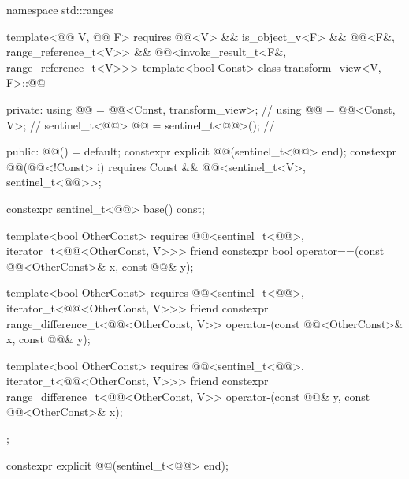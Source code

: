 %
\begin{codeblock}
namespace std::ranges {
  template<@@ V, @@ F>
    requires @@<V> && is_object_v<F> &&
             @@<F&, range_reference_t<V>> &&
             @@<invoke_result_t<F&, range_reference_t<V>>>
  template<bool Const>
  class transform_view<V, F>::@@ {
  private:
    using @@ = @@<Const, transform_view>;  // \expos
    using @@ = @@<Const, V>;                 // \expos
    sentinel_t<@@> @@ = sentinel_t<@@>();         // \expos

  public:
    @@() = default;
    constexpr explicit @@(sentinel_t<@@> end);
    constexpr @@(@@<!Const> i)
      requires Const && @@<sentinel_t<V>, sentinel_t<@@>>;

    constexpr sentinel_t<@@> base() const;

    template<bool OtherConst>
      requires @@<sentinel_t<@@>, iterator_t<@@<OtherConst, V>>>
    friend constexpr bool operator==(const @@<OtherConst>& x, const @@& y);

    template<bool OtherConst>
      requires @@<sentinel_t<@@>, iterator_t<@@<OtherConst, V>>>
    friend constexpr range_difference_t<@@<OtherConst, V>>
      operator-(const @@<OtherConst>& x, const @@& y);

    template<bool OtherConst>
      requires @@<sentinel_t<@@>, iterator_t<@@<OtherConst, V>>>
    friend constexpr range_difference_t<@@<OtherConst, V>>
      operator-(const @@& y, const @@<OtherConst>& x);
  };
}
\end{codeblock}

%
\begin{itemdecl}
constexpr explicit @@(sentinel_t<@@> end);
\end{itemdecl}

